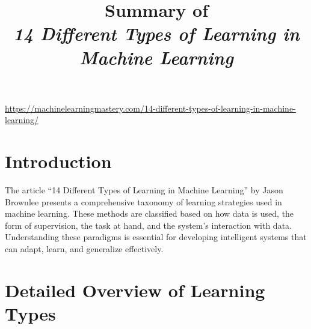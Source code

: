 \documentclass[a4paper,11pt]{article}
\title{Summary of \\
\textit{14 Different Types of Learning in Machine Learning}}
\author{}
\date{}
\begin{document}
\maketitle

\url{https://machinelearningmastery.com/14-different-types-of-learning-in-machine-learning/}

\section{Introduction}

The article ``14 Different Types of Learning in Machine Learning'' by Jason Brownlee presents a comprehensive taxonomy of learning strategies used in machine learning. These methods are classified based on how data is used, the form of supervision, the task at hand, and the system's interaction with data. Understanding these paradigms is essential for developing intelligent systems that can adapt, learn, and generalize effectively.

\section{Detailed Overview of Learning Types}
\end{document}
